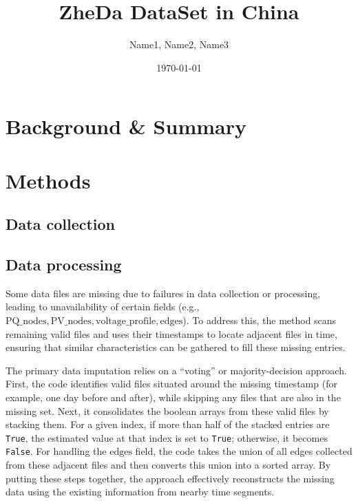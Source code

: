 \documentclass[12pt]{article}
\title{ZheDa DataSet in China}
\author{Name1, Name2, Name3}
\date{\today}
\begin{document}
\maketitle

\begin{abstract}
\end{abstract}

\section*{Background \& Summary}

\section*{Methods}
\subsection*{Data collection}

\subsection*{Data processing}
Some data files are missing due to failures in data collection or processing, leading to unavailability of certain fields (e.g., \(\mathrm{PQ\_nodes}, \mathrm{PV\_nodes}, \mathrm{voltage\_profile}, \mathrm{edges}\)). To address this, the method scans remaining valid files and uses their timestamps to locate adjacent files in time, ensuring that similar characteristics can be gathered to fill these missing entries.

The primary data imputation relies on a ``voting'' or majority-decision approach. First, the code identifies valid files situated around the missing timestamp (for example, one day before and after), while skipping any files that are also in the missing set. Next, it consolidates the boolean arrays from these valid files by stacking them. For a given index, if more than half of the stacked entries are \texttt{True}, the estimated value at that index is set to \texttt{True}; otherwise, it becomes \texttt{False}. For handling the \(\mathrm{edges}\) field, the code takes the union of all edges collected from these adjacent files and then converts this union into a sorted array. By putting these steps together, the approach effectively reconstructs the missing data using the existing information from nearby time segments.
\end{document}
